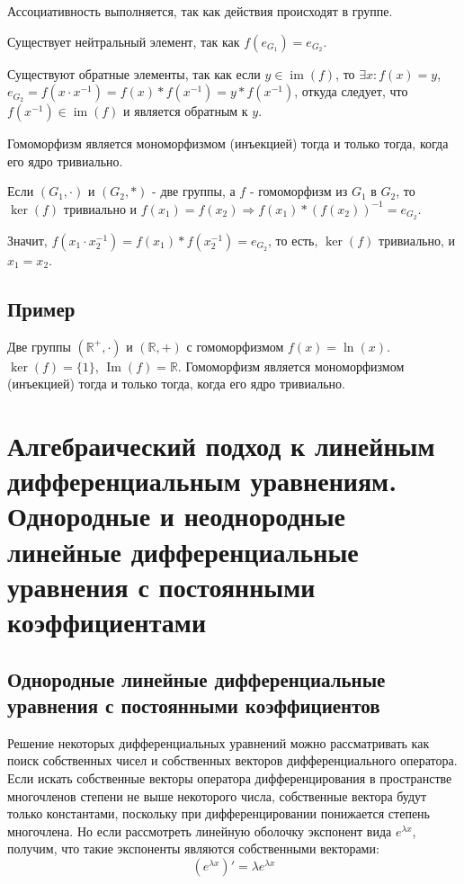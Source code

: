 \documentclass[12pt]{article}
\begin{document}
    Ассоциативность выполняется, так как действия происходят в группе.

    Существует нейтральный элемент, так как $f(e_{G_1})=e_{G_2}$.

    Существуют обратные элементы, так как если $y\in \operatorname{im}(f)$, то $\exists x:f(x)=y$, $e_{G_2}=f(x\cdot x^{-1})=f(x)*f(x^{-1})=y*f(x^{-1})$, откуда следует, что $f(x^{-1})\in \operatorname{im}(f)$ и является обратным к $y$.

    Гомоморфизм является мономорфизмом (инъекцией) тогда и только тогда, когда его ядро тривиально.

    Если $(G_1,\cdot)$ и $(G_2,*)$ - две группы, а $f$ - гомоморфизм из $G_1$ в $G_2$, то $\operatorname{ker}(f)$ тривиально и $f(x_1)=f(x_2)\Rightarrow f(x_1)*(f(x_2))^{-1}=e_{G_2}$.

    Значит, $f(x_1\cdot x_2^{-1})=f(x_1)*f(x_2^{-1})=e_{G_2}$, то есть, $\operatorname{ker}(f)$ тривиально, и $x_1=x_2$.

    \subsection{Пример}

    Две группы $(\mathbb{R}^{+},\cdot)$ и $(\mathbb{R},+)$ с гомоморфизмом $f(x) = \ln(x)$. $\ker(f) = \{1\}$, $\operatorname{Im}(f) = \mathbb{R}$. Гомоморфизм является мономорфизмом (инъекцией) тогда и только тогда, когда его ядро тривиально.

    \section{Алгебраический подход к линейным дифференциальным уравнениям. Однородные и неоднородные линейные дифференциальные уравнения с постоянными коэффициентами}

    \subsection{Однородные линейные дифференциальные уравнения с постоянными коэффициентов}
    Решение некоторых дифференциальных уравнений можно рассматривать как поиск
    собственных чисел и собственных векторов дифференциального оператора.  Если искать собственные векторы оператора дифференцирования в пространстве многочленов степени не выше некоторого числа, собственные вектора будут только константами, поскольку при дифференцировании понижается степень многочлена. Но если рассмотреть линейную оболочку экспонент вида $e^{\lambda x}$, получим, что такие экспоненты являются собственными векторами:
\[
    (e^{\lambda x})' = \lambda e^{\lambda x}
\]
\end{document}
